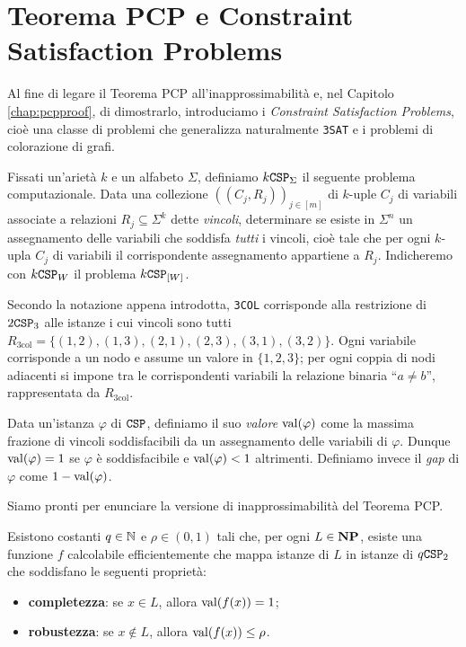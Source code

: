 \section{Teorema PCP e Constraint Satisfaction Problems}

Al fine di legare il Teorema PCP all'inapprossimabilità e, nel Capitolo
\ref{chap:pcpproof}, di dimostrarlo, introduciamo i
\emph{Constraint Satisfaction Problems}, cioè una classe di problemi che
generalizza naturalmente \texttt{3SAT} e i problemi di colorazione di grafi.

\begin{definition}
	Fissati un'arietà $k$ e un alfabeto $\Sigma$, definiamo $k\mathtt{CSP}_\Sigma$ il
	seguente problema computazionale. Data una collezione
	$((C_j, R_j))_{j \in [m]}$ di $k$-uple $C_j$ di variabili associate a
	relazioni $R_j \subseteq \Sigma^k$ dette \emph{vincoli}, determinare se
	esiste in $\Sigma^n$ un assegnamento delle variabili che soddisfa
	\emph{tutti} i vincoli, cioè tale che per ogni $k$-upla $C_j$ di variabili
	il corrispondente assegnamento appartiene a $R_j$.
	Indicheremo con $k\mathtt{CSP}_W$ il problema $k\mathtt{CSP}_{[W]}$.
\end{definition}

Secondo la notazione appena introdotta, \texttt{3COL}
corrisponde alla restrizione di $2\mathtt{CSP}_3$ alle istanze i cui vincoli sono tutti
$R_{\text{3col}} = \{(1, 2), (1, 3), (2, 1), (2, 3), (3, 1), (3, 2)\}$.
Ogni variabile corrisponde a un nodo e assume un valore in $\{1, 2, 3\}$; per
ogni coppia di nodi adiacenti si impone tra le corrispondenti variabili la
relazione binaria ``$a \neq b$'', rappresentata da $R_{\text{3col}}$.

Data un'istanza $\varphi$ di $\mathtt{CSP}$, definiamo il suo \emph{valore}
$\operatorname{val}(\varphi)$ come la massima frazione di vincoli soddisfacibili da un
assegnamento delle variabili di $\varphi$. Dunque $\operatorname{val}(\varphi) = 1$ se
$\varphi$ è soddisfacibile e $\operatorname{val}(\varphi) < 1$ altrimenti. Definiamo invece
il \emph{gap} di $\varphi$ come $1 - \operatorname{val}(\varphi)$.

Siamo pronti per enunciare la versione di inapprossimabilità del Teorema PCP.

\begin{theorem} \label{thm:pcpapprox}
	Esistono costanti $q \in \mathbb{N}$ e $\rho \in (0, 1)$ tali che, per ogni
	$L \in \mathbf{NP}$, esiste una funzione $f$ calcolabile efficientemente che mappa
	istanze di $L$ in istanze di $q\mathtt{CSP}_2$ che soddisfano le seguenti proprietà:
	\begin{itemize}
		\item \textbf{completezza}: se $x \in L$, allora $\operatorname{val}(f(x)) = 1$;
		\item \textbf{robustezza}: se $x \notin L$, allora $\operatorname{val}(f(x)) \le \rho$.
	\end{itemize}
\end{theorem}

